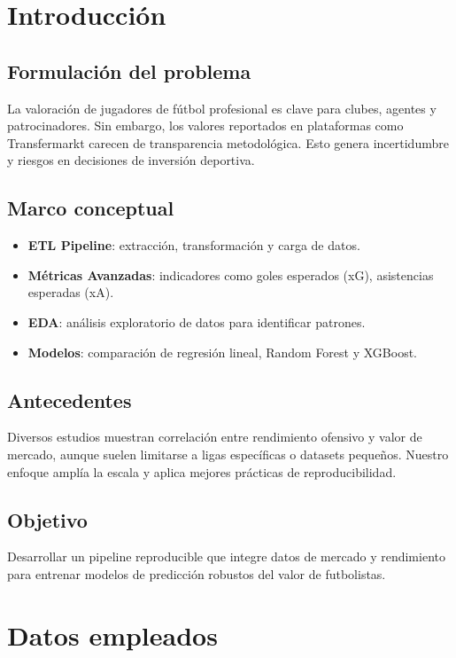 \documentclass[12pt,letterpaper]{article}
\begin{document}
\section{Introducción}
\subsection{Formulación del problema}
La valoración de jugadores de fútbol profesional es clave para clubes, agentes y patrocinadores. Sin embargo, los valores reportados en plataformas como Transfermarkt carecen de transparencia metodológica. Esto genera incertidumbre y riesgos en decisiones de inversión deportiva.

\subsection{Marco conceptual}
\begin{itemize}
    \item \textbf{ETL Pipeline}: extracción, transformación y carga de datos.
    \item \textbf{Métricas Avanzadas}: indicadores como goles esperados (xG), asistencias esperadas (xA).
    \item \textbf{EDA}: análisis exploratorio de datos para identificar patrones.
    \item \textbf{Modelos}: comparación de regresión lineal, Random Forest y XGBoost.
\end{itemize}

\subsection{Antecedentes}
Diversos estudios muestran correlación entre rendimiento ofensivo y valor de mercado, aunque suelen limitarse a ligas específicas o datasets pequeños. Nuestro enfoque amplía la escala y aplica mejores prácticas de reproducibilidad.

\subsection{Objetivo}
Desarrollar un pipeline reproducible que integre datos de mercado y rendimiento para entrenar modelos de predicción robustos del valor de futbolistas.

\section{Datos empleados}
\end{document}
